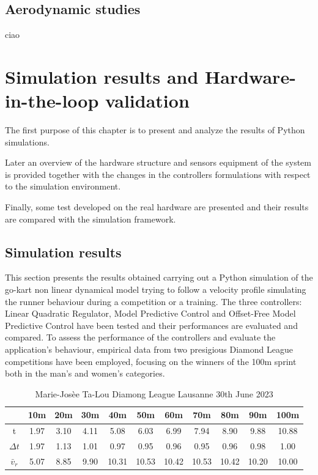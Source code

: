 \documentclass[a4paper,12pt,oneside]{book}
\begin{document}
\section{Aerodynamic studies}
ciao


\chapter{Simulation results and Hardware-in-the-loop validation}
\label{chapter:Simulations_and_results}
The first purpose of this chapter is to present and analyze the results of Python simulations.

Later an overview of the hardware structure and sensors equipment of the system is provided together with the changes in the controllers formulations with respect to the simulation environment. 

Finally, some test developed on the real hardware are presented and their results are compared with the simulation framework.

\section{Simulation results}
This section presents the results obtained carrying out a Python simulation of the go-kart non linear dynamical model trying to follow a velocity profile simulating the runner behaviour during a competition or a training.
The three controllers: Linear Quadratic Regulator, Model Predictive Control and Offset-Free Model Predictive Control have been tested and their performances are evaluated and compared.
To assess the performance of the controllers and evaluate the application's behaviour, empirical data from two presigious Diamond League competitions have been employed, focusing on the winners of the 100m sprint both in the man's and women's categories.

\begin{table}[htbp]
	\centering
	\begin{adjustbox}{max width=\textwidth}
	\begin{tabular}{c|c|c|c|c|c|c|c|c|c|c}
           & 10m & 20m & 30m & 40m & 50m & 60m & 70m & 80m & 90m &100m \\
	\hline
	\hline
	t & 1.97 & 3.10 & 4.11 & 5.08 & 6.03 & 6.99 & 7.94 & 8.90 & 9.88 & 10.88  \\	
	$\Delta t$ & 1.97 & 1.13 & 1.01 & 0.97 & 0.95 & 0.96 & 0.95 & 0.96 & 0.98 & 1.00 \\
	$\bar{v}_r$ & 5.07 & 8.85 & 9.90 & 10.31 & 10.53 & 10.42 & 10.53 & 10.42 & 10.20 & 10.00 \\
	\hline
	\end{tabular}
	\end{adjustbox}
\caption{Marie-Josèe Ta-Lou Diamong League Lausanne 30th June 2023}
\label{tab:Women}
\end{table}
\end{document}
